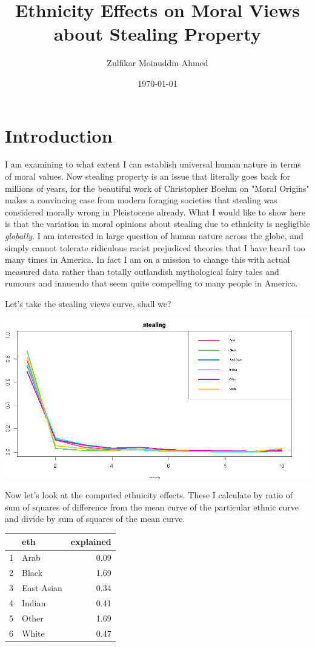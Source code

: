 \documentclass{amsart}
\title{Ethnicity Effects on Moral Views about Stealing Property}
\author{Zulfikar Moinuddin Ahmed}
\date{\today}
\begin{document}
\maketitle


\section{Introduction}

I am examining to what extent I can establish universal human nature in terms of moral values.  Now stealing property is an issue that literally goes back for millions of years, for the beautiful work of Christopher Boehm on "Moral Origins" makes a convincing case from modern foraging societies that stealing was considered morally wrong in Pleistocene already.  What I would like to show here is that the variation in moral opinions about stealing due to ethnicity is negligible {\em globally}.  I am interested in large question of human nature across the globe, and simply cannot tolerate ridiculous racist prejudiced theories that I have heard too many times in America.  In fact I am on a mission to change this with actual measured data rather than totally outlandish mythological fairy tales and rumours and innuendo that seem quite compelling to many people in America.

Let's take the stealing views curve, shall we?

\includegraphics[scale=0.5]{ethsteal.jpeg}

Now let's look at the computed ethnicity effects.  These I calculate by ratio of sum of squares of difference from the mean curve of the particular ethnic curve and divide by sum of squares of the mean curve.  

\begin{table}[ht]
\centering
\begin{tabular}{rlr}
  \hline
 & eth & explained \\ 
  \hline
1 & Arab & 0.09 \\ 
  2 & Black & 1.69 \\ 
  3 & East Asian & 0.34 \\ 
  4 & Indian & 0.41 \\ 
  5 & Other & 1.69 \\ 
  6 & White & 0.47 \\ 
   \hline
\end{tabular}
\end{table}
\end{document}
